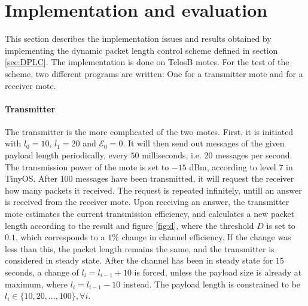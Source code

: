 \section{Implementation and evaluation}
\label{sec:schemeTest}
This section describes the implementation issues and results obtained by implementing the dynamic packet length control scheme defined in section \ref{sec:DPLC}. The implementation is done on TelosB motes. For the test of the scheme, two different programs are written: One for a transmitter mote and for a receiver mote. 
\paragraph{Transmitter} The transmitter is the more complicated of the two motes. First, it is initiated with $l_0 = 10$, $l_1 = 20$ and $\mathcal{E}_0 = 0$. It will then send out messages of the given payload length periodically, every $50$ milliseconds, i.e. $20$ messages per second. The transmission power of the mote is set to $-15$ dBm, according to level $7$ in TinyOS. After $100$ messages have been transmitted, it will request the receiver how many packets it received. The request is repeated infinitely, untill an answer is received from the receiver mote. Upon receiving an answer, the transmitter mote estimates the current transmission efficiency, and calculates a new packet length according to the result and figure \ref{fig:d}, where the threshold $D$ is set to $0.1$, which corresponds to a $1 \%$ change in channel efficiency. If the change was less than this, the packet length remains the same, and the transmitter is considered in steady state. After the channel has been in steady state for $15$ seconds, a change of $l_i = l_{i-1} +10$ is forced, unless the payload size is already at maximum, where $l_i = l_{i-1} - 10$ instead. The payload length is constrained to be $l_i \in \{10, 20, ... , 100\},\forall i$.
